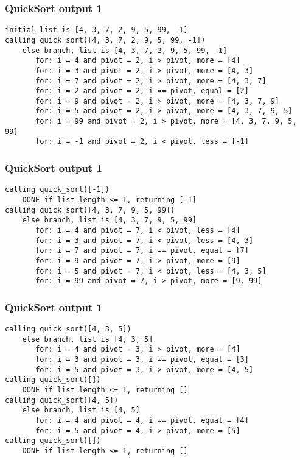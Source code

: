 \documentclass{beamer}
\begin{document}
    \begin{frame}[fragile]
        \frametitle{QuickSort output 1}
        \scriptsize
        \begin{verbatim}
initial list is [4, 3, 7, 2, 9, 5, 99, -1]
calling quick_sort([4, 3, 7, 2, 9, 5, 99, -1])
    else branch, list is [4, 3, 7, 2, 9, 5, 99, -1]
       for: i = 4 and pivot = 2, i > pivot, more = [4]
       for: i = 3 and pivot = 2, i > pivot, more = [4, 3]
       for: i = 7 and pivot = 2, i > pivot, more = [4, 3, 7]
       for: i = 2 and pivot = 2, i == pivot, equal = [2]
       for: i = 9 and pivot = 2, i > pivot, more = [4, 3, 7, 9]
       for: i = 5 and pivot = 2, i > pivot, more = [4, 3, 7, 9, 5]
       for: i = 99 and pivot = 2, i > pivot, more = [4, 3, 7, 9, 5, 99]
       for: i = -1 and pivot = 2, i < pivot, less = [-1]
        \end{verbatim}
    \end{frame}

    \begin{frame}[fragile]
        \frametitle{QuickSort output 1}
        \scriptsize
        \begin{verbatim}
calling quick_sort([-1])
    DONE if list length <= 1, returning [-1]
calling quick_sort([4, 3, 7, 9, 5, 99])
    else branch, list is [4, 3, 7, 9, 5, 99]
       for: i = 4 and pivot = 7, i < pivot, less = [4]
       for: i = 3 and pivot = 7, i < pivot, less = [4, 3]
       for: i = 7 and pivot = 7, i == pivot, equal = [7]
       for: i = 9 and pivot = 7, i > pivot, more = [9]
       for: i = 5 and pivot = 7, i < pivot, less = [4, 3, 5]
       for: i = 99 and pivot = 7, i > pivot, more = [9, 99]
        \end{verbatim}
    \end{frame}

    \begin{frame}[fragile]
        \frametitle{QuickSort output 1}
        \scriptsize
        \begin{verbatim}
calling quick_sort([4, 3, 5])
    else branch, list is [4, 3, 5]
       for: i = 4 and pivot = 3, i > pivot, more = [4]
       for: i = 3 and pivot = 3, i == pivot, equal = [3]
       for: i = 5 and pivot = 3, i > pivot, more = [4, 5]
calling quick_sort([])
    DONE if list length <= 1, returning []
calling quick_sort([4, 5])
    else branch, list is [4, 5]
       for: i = 4 and pivot = 4, i == pivot, equal = [4]
       for: i = 5 and pivot = 4, i > pivot, more = [5]
calling quick_sort([])
    DONE if list length <= 1, returning []
        \end{verbatim}
    \end{frame}
\end{document}
